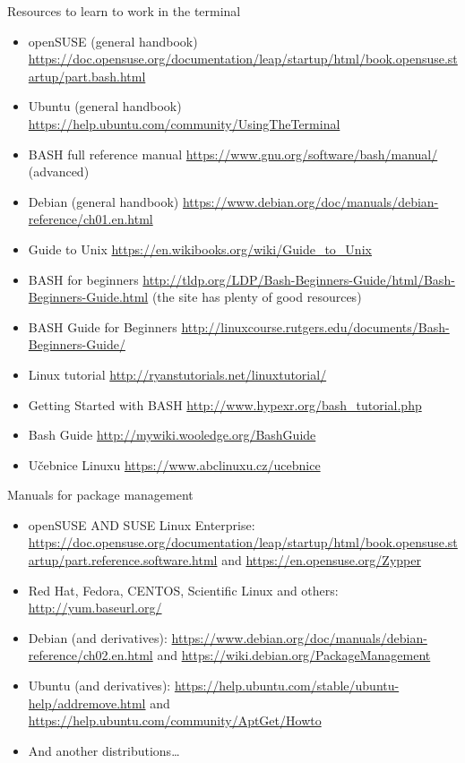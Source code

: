 \documentclass[compress, ucs, xelatex, 11pt, xcolor=svgnames,
  hyperref={
    bookmarks=true,
    unicode=true,
    colorlinks=true,
    pdftitle={Linux, command line and MetaCentrum},
    plainpages=false,
    pdfauthor={Vojtech Zeisek},
    pdfsubject={Course about use of Linux command line, writing shell scripts and using MetaCentrum of CESNET},
    pdfcreator={XeLaTeX},
    pdfkeywords={Linux, GNU, BASH, shell, command line, MetaCentrum},
    linkcolor=DarkRed,
    anchorcolor=DarkBlue,
    citecolor=Indigo,
    filecolor=NavyBlue,
    menucolor=DarkMagenta,
    urlcolor=DarkBlue,
    pdftex},
  url={hyphens, lowtilde} %
  ]{beamer}
\begin{document}
\begin{frame}[allowframebreaks]{Resources to learn to work in the terminal}
  \begin{itemize}
    \item openSUSE (general handbook) \url{https://doc.opensuse.org/documentation/leap/startup/html/book.opensuse.startup/part.bash.html}
    \item Ubuntu (general handbook) \url{https://help.ubuntu.com/community/UsingTheTerminal}
    \item BASH full reference manual \url{https://www.gnu.org/software/bash/manual/} (advanced)
    \item Debian (general handbook) \url{https://www.debian.org/doc/manuals/debian-reference/ch01.en.html}
    \item Guide to Unix \url{https://en.wikibooks.org/wiki/Guide_to_Unix}
    \item BASH for beginners \url{http://tldp.org/LDP/Bash-Beginners-Guide/html/Bash-Beginners-Guide.html} (the site has plenty of good resources)
    \item BASH Guide for Beginners \url{http://linuxcourse.rutgers.edu/documents/Bash-Beginners-Guide/}
    \item Linux tutorial \url{http://ryanstutorials.net/linuxtutorial/}
    \item Getting Started with BASH \url{http://www.hypexr.org/bash_tutorial.php}
    \item Bash Guide \url{http://mywiki.wooledge.org/BashGuide}
    \item Učebnice Linuxu \url{https://www.abclinuxu.cz/ucebnice}
  \end{itemize}
\end{frame}

\begin{frame}{Manuals for package management}
  \begin{itemize}
    \item openSUSE AND SUSE Linux Enterprise: \url{https://doc.opensuse.org/documentation/leap/startup/html/book.opensuse.startup/part.reference.software.html} and \url{https://en.opensuse.org/Zypper}
    \item Red Hat, Fedora, CENTOS, Scientific Linux and others: \url{http://yum.baseurl.org/}
    \item Debian (and derivatives): \url{https://www.debian.org/doc/manuals/debian-reference/ch02.en.html} and \url{https://wiki.debian.org/PackageManagement}
    \item Ubuntu (and derivatives): \url{https://help.ubuntu.com/stable/ubuntu-help/addremove.html} and \url{https://help.ubuntu.com/community/AptGet/Howto}
    \item And another distributions\ldots
  \end{itemize}
\end{frame}
\end{document}
